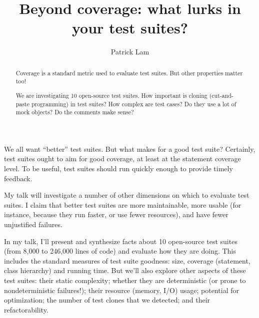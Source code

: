 \documentclass[10pt]{article}
\title{Beyond coverage: what lurks in your test suites?}
\author{Patrick Lam}
\begin{document}
\maketitle
\begin{abstract}
Coverage is a standard metric used to evaluate test suites. But other
properties matter too!

We are investigating 10 open-source test suites. How important is
cloning (cut-and-paste programming) in test suites? How complex are
test cases? Do they use a lot of mock objects?  Do the comments make
sense?
\end{abstract}

We all want ``better'' test suites. But what makes for a good test
suite?  Certainly, test suites ought to aim for good coverage, at
least at the statement coverage level. To be useful, test suites should
run quickly enough to provide timely feedback. 

My talk will investigate a number of other dimensions on which to
evaluate test suites. I claim that better test suites are more
maintainable, more usable (for instance, because they run faster, or
use fewer resources), and have fewer unjustified failures.

In my talk, I'll present and synthesize facts about 10 open-source test suites (from
8,000 to 246,000 lines of code) and evaluate how they are doing.  This
includes the standard measures of test suite goodness: size, coverage
(statement, class hierarchy) and running time. But we'll also explore
other aspects of these test suites: their static complexity; whether
they are deterministic (or prone to nondeterministic failures!); their
resource (memory, I/O) usage; potential for optimization; the number
of test clones that we detected; and their refactorability.
\end{document}
